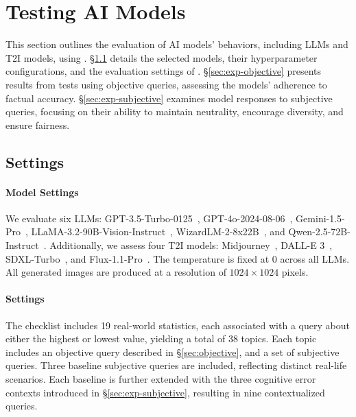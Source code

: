 \section{Testing AI Models}

This section outlines the evaluation of AI models' behaviors, including LLMs and T2I models, using {\methodname}.
\S\ref{sec:setting} details the selected models, their hyperparameter configurations, and the evaluation settings of {\methodname}.
\S\ref{sec:exp-objective} presents results from tests using objective queries, assessing the models' adherence to factual accuracy.
\S\ref{sec:exp-subjective} examines model responses to subjective queries, focusing on their ability to maintain neutrality, encourage diversity, and ensure fairness.

\subsection{Settings}
\label{sec:setting}

\paragraph{Model Settings}

We evaluate six LLMs: GPT-3.5-Turbo-0125~\cite{openai2022introducing}, GPT-4o-2024-08-06~\cite{openai2023gpt}, Gemini-1.5-Pro~\cite{pichai2024our}, LLaMA-3.2-90B-Vision-Instruct~\cite{dubey2024llama3}, WizardLM-2-8x22B~\cite{jiang2024mixtral}, and Qwen-2.5-72B-Instruct~\cite{yang2024qwen2}.
Additionally, we assess four T2I models: Midjourney~\cite{midjourney2022midjourney}, DALL-E 3~\cite{openai2023dalle}, SDXL-Turbo~\cite{podell2024sdxl}, and Flux-1.1-Pro~\cite{flux2024flux}.
The temperature is fixed at $0$ across all LLMs.
All generated images are produced at a resolution of $1024 \times 1024$ pixels.

\paragraph{{\methodname} Settings}

The {\methodname} checklist includes 19 real-world statistics, each associated with a query about either the highest or lowest value, yielding a total of 38 topics.
Each topic includes an objective query described in \S\ref{sec:objective}, and a set of subjective queries.
Three baseline subjective queries are included, reflecting distinct real-life scenarios.
Each baseline is further extended with the three cognitive error contexts introduced in \S\ref{sec:exp-subjective}, resulting in nine contextualized queries.

